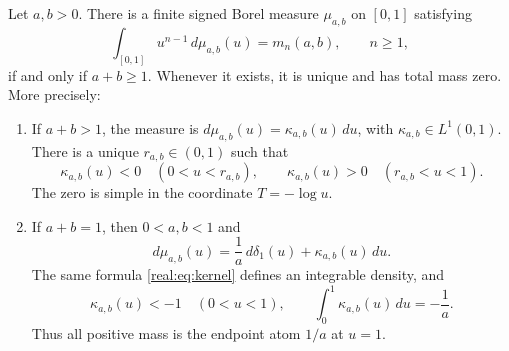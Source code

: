 \begin{theorem}
\label{real:thm:measure}
Let $a,b>0$. There is a finite signed Borel measure $\mu_{a,b}$ on
$[0,1]$ satisfying
\begin{equation}\label{real:eq:moments}
 \int_{[0,1]}u^{n-1}\,d\mu_{a,b}(u)=m_n(a,b),\qquad n\geq1,
\end{equation}
if and only if $a+b\geq1$. Whenever it exists, it is unique and has
total mass zero. More precisely:
\begin{enumerate}
\item If $a+b>1$, the measure is
$d\mu_{a,b}(u)=\kappa_{a,b}(u)\,du$, with $\kappa_{a,b}\in L^1(0,1)$.
There is a unique $r_{a,b}\in(0,1)$ such that
\begin{equation}\label{real:eq:signs}
 \kappa_{a,b}(u)<0\quad(0<u<r_{a,b}),\qquad
 \kappa_{a,b}(u)>0\quad(r_{a,b}<u<1).
\end{equation}
The zero is simple in the coordinate $T=-\log u$.
\item If $a+b=1$, then $0<a,b<1$ and
\begin{equation}\label{real:eq:atom}
 d\mu_{a,b}(u)=\frac1a\,d\delta_1(u)+\kappa_{a,b}(u)\,du.
\end{equation}
The same formula \eqref{real:eq:kernel} defines an integrable density,
and
\begin{equation}\label{real:eq:critical-density}
 \kappa_{a,b}(u)<-1\quad(0<u<1),\qquad
 \int_0^1\kappa_{a,b}(u)\,du=-\frac1a.
\end{equation}
Thus all positive mass is the endpoint atom $1/a$ at $u=1$.
\end{enumerate}
\end{theorem}

